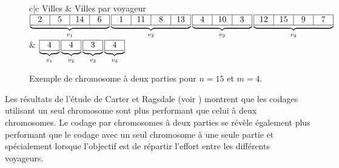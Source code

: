  \begin{figure}
   \centering
   \begin{tabular}{c|c}
    \centering Villes & \centering Villes par voyageur \tabularnewline
    \centering
    \ensuremath{
    \underbrace{
      \begin{tabular}{|*{4}{p{0.4cm}|}}
      \hline
      \centering 2 & \centering 5 & \centering 14 & \centering 6 \tabularnewline
      \hline
      \end{tabular}
    }_{\ensuremath{v_{1}}}
    \underbrace{
      \begin{tabular}{|*{4}{p{0.4cm}|}}
	    \hline
	    \centering 1 & \centering 11 & \centering 8 & \centering 13 \tabularnewline
	    \hline
	  \end{tabular}
	}_{v_{2}}
      \underbrace{
	  \begin{tabular}{|*{3}{p{0.4cm}|}}
	    \hline
	    \centering 4 & \centering 10 & \centering 3 \tabularnewline
	    \hline
	  \end{tabular}
	}_{v_{3}}
	\underbrace{
	  \begin{tabular}{|*{4}{p{0.4cm}|}}
	    \hline
	    \centering 12 & \centering 15 & \centering 9 & \centering 7 \tabularnewline
	    \hline
	  \end{tabular}
	}_{v_{4}}
  }
  &
  \ensuremath{
     \underbrace{
	\begin{tabular}{|p{0.4cm}|}
	  \hline
	  \centering 4 \tabularnewline
	  \hline
        \end{tabular}
     }_{v_{1}}
     \underbrace{
	\begin{tabular}{|p{0.4cm}|}
	  \hline
	  \centering 4 \tabularnewline
	  \hline
        \end{tabular}
     }_{v_{2}}
     \underbrace{
	\begin{tabular}{|p{0.4cm}|}
	  \hline
	  \centering 3 \tabularnewline
	  \hline
        \end{tabular}
     }_{v_{3}}
     \underbrace{
	\begin{tabular}{|p{0.4cm}|}
	  \hline
	  \centering 4 \tabularnewline
	  \hline
        \end{tabular}
     }_{v_{4}}
     }
    \end{tabular}
    \caption{Exemple de chromosome à deux parties pour $n=15$ et $m=4$.}
    \label{fig:mtsp:chromosome2parties}
  \end{figure}

  Les résultats de l'étude de Carter et Ragsdale (voir \cite{Carter2006}) montrent que les codages utilisant un seul chromosome sont plus performant que celui à deux chromosomes. Le codage par chromosomes à deux parties se révèle également plus performant que le codage avec un seul chromosome à une seule partie et spécialement lorsque l'objectif est de répartir l'effort entre les différents voyageurs.
  
